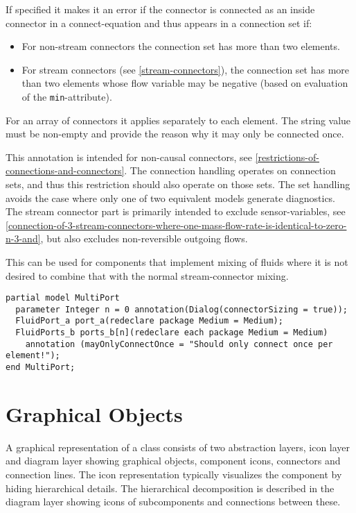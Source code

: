 If specified it makes it an error if the connector is connected as an inside connector in a connect-equation and thus appears in a connection set if:
\begin{itemize}
\item For non-stream connectors the connection set has more than two elements.
\item For stream connectors (see \cref{stream-connectors}), the connection set has more than two elements whose flow variable may be negative (based on evaluation of the \lstinline!min!-attribute).
\end{itemize}
For an array of connectors it applies separately to each element.
The string value must be non-empty and provide the reason why it may only be connected once.

\begin{nonnormative}
This annotation is intended for non-causal connectors, see \cref{restrictions-of-connections-and-connectors}.
The connection handling operates on connection sets, and thus this restriction should also operate on those sets.
The set handling avoids the case where only one of two equivalent models generate diagnostics.
The stream connector part is primarily intended to exclude sensor-variables, see \cref{connection-of-3-stream-connectors-where-one-mass-flow-rate-is-identical-to-zero-n-3-and}, but also excludes non-reversible outgoing flows.
\end{nonnormative}

\begin{example}
This can be used for components that implement mixing of fluids where it is not desired to combine that with the normal stream-connector mixing.
\begin{lstlisting}[language=modelica]
partial model MultiPort
  parameter Integer n = 0 annotation(Dialog(connectorSizing = true));
  FluidPort_a port_a(redeclare package Medium = Medium);
  FluidPorts_b ports_b[n](redeclare each package Medium = Medium)
    annotation (mayOnlyConnectOnce = "Should only connect once per element!");
end MultiPort;
\end{lstlisting}
\end{example}

\section{Graphical Objects}\label{annotations-for-graphical-objects}\label{graphical-objects}

A graphical representation of a class consists of two abstraction layers, icon layer and diagram layer showing graphical objects, component icons, connectors and connection lines.
The icon representation typically visualizes the component by hiding hierarchical details.
The hierarchical decomposition is described in the diagram layer showing icons of subcomponents and connections between these.

